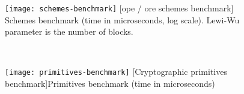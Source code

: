 \begin{figure}[!ht]
	\centering
	\begin{minipage}[t]{0.48\columnwidth}
		\captionsetup[figure]{justification=centering}
		\centering
		\texttt{[image: schemes-benchmark]}
		[\acrshort{ope} / \acrshort{ore} schemes benchmark]{
			Schemes benchmark (time in microseconds, log scale).
			Lewi-Wu parameter is the number of blocks.
		}%
		\label{figure:benchmarks:schemes}
	\end{minipage}
	~ %
	\begin{minipage}[t]{0.48\columnwidth}
		\captionsetup[figure]{justification=centering}
		\centering
		\texttt{[image: primitives-benchmark]}
		[Cryptographic primitives benchmark]{Primitives benchmark (time in microseconds)}%
		\label{figure:benchmarks:primitives}
	\end{minipage}
\end{figure}
